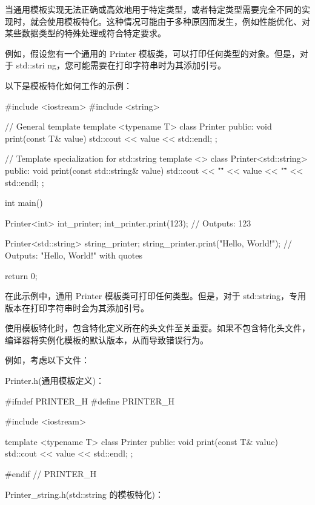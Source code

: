 当通用模板实现无法正确或高效地用于特定类型，或者特定类型需要完全不同的实现时，就会使用模板特化。这种情况可能由于多种原因而发生，例如性能优化、对某些数据类型的特殊处理或符合特定要求。

例如，假设您有一个通用的 Printer 模板类，可以打印任何类型的对象。但是，对于 std::stri ng，您可能需要在打印字符串时为其添加引号。


以下是模板特化如何工作的示例：

\begin{cpp}
#include <iostream>
#include <string>

// General template
template <typename T>
class Printer {
    public:
    void print(const T& value) {
        std::cout << value << std::endl;
    }
};

// Template specialization for std::string
template <>
class Printer<std::string> {
    public:
    void print(const std::string& value) {
        std::cout << "\"" << value << "\"" << std::endl;
    }
};

int main() {
    Printer<int> int_printer;
    int_printer.print(123); // Outputs: 123

    Printer<std::string> string_printer;
    string_printer.print("Hello, World!"); // Outputs: "Hello, World!" with quotes

    return 0;
}
\end{cpp}

在此示例中，通用 Printer 模板类可打印任何类型。但是，对于 std::string，专用版本在打印字符串时会为其添加引号。


使用模板特化时，包含特化定义所在的头文件至关重要。如果不包含特化头文件，编译器将实例化模板的默认版本，从而导致错误行为。

例如，考虑以下文件：

Printer.h(通用模板定义)：

\begin{cpp}
#ifndef PRINTER_H
#define PRINTER_H

#include <iostream>

template <typename T>
class Printer {
    public:
    void print(const T& value) {
        std::cout << value << std::endl;
    }
};

#endif // PRINTER_H
\end{cpp}

Printer\_string.h(std::string 的模板特化)：

